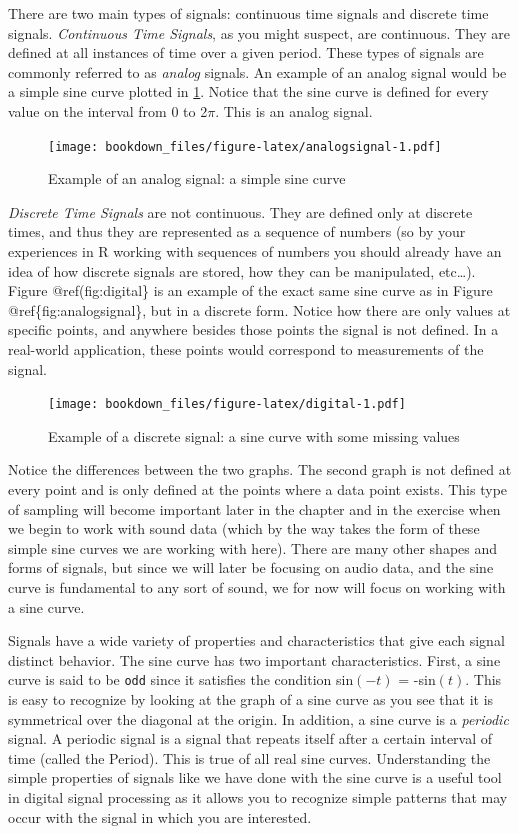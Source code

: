 \documentclass[]{krantz}
\begin{document}
There are two main types of signals: continuous time signals and
discrete time signals. \emph{Continuous Time Signals}, as you might
suspect, are continuous. They are defined at all instances of time over
a given period. These types of signals are commonly referred to as
\emph{analog} signals. An example of an analog signal would be a simple
sine curve plotted in \ref{fig:analogsignal}. Notice that the sine curve
is defined for every value on the interval from 0 to 2\(\pi\). This is
an analog signal.

\begin{figure}
\centering
\texttt{[image: bookdown\_files/figure-latex/analogsignal-1.pdf]}
\caption{\label{fig:analogsignal}Example of an analog signal: a simple sine
curve}
\end{figure}

\emph{Discrete Time Signals} are not continuous. They are defined only
at discrete times, and thus they are represented as a sequence of
numbers (so by your experiences in R working with sequences of numbers
you should already have an idea of how discrete signals are stored, how
they can be manipulated, etc\ldots{}). Figure @ref(fig:digital\} is an
example of the exact same sine curve as in Figure
@ref\{fig:analogsignal\}, but in a discrete form. Notice how there are
only values at specific points, and anywhere besides those points the
signal is not defined. In a real-world application, these points would
correspond to measurements of the signal.

\begin{figure}
\centering
\texttt{[image: bookdown\_files/figure-latex/digital-1.pdf]}
\caption{\label{fig:digital}Example of a discrete signal: a sine curve with
some missing values}
\end{figure}

Notice the differences between the two graphs. The second graph is not
defined at every point and is only defined at the points where a data
point exists. This type of sampling will become important later in the
chapter and in the exercise when we begin to work with sound data (which
by the way takes the form of these simple sine curves we are working
with here). There are many other shapes and forms of signals, but since
we will later be focusing on audio data, and the sine curve is
fundamental to any sort of sound, we for now will focus on working with
a sine curve.

Signals have a wide variety of properties and characteristics that give
each signal distinct behavior. The sine curve has two important
characteristics. First, a sine curve is said to be \texttt{odd} since it
satisfies the condition sin\((-t)\) = -sin\((t)\). This is easy to
recognize by looking at the graph of a sine curve as you see that it is
symmetrical over the diagonal at the origin. In addition, a sine curve
is a \emph{periodic} signal. A periodic signal is a signal that repeats
itself after a certain interval of time (called the Period). This is
true of all real sine curves. Understanding the simple properties of
signals like we have done with the sine curve is a useful tool in
digital signal processing as it allows you to recognize simple patterns
that may occur with the signal in which you are interested.
\end{document}
